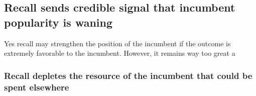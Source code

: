 \documentclass[hyphens, crop=false]{standalone}
\begin{document}
		\subsection*{Recall sends credible signal that incumbent popularity is waning}
		
		Yes recall may strengthen the position of the incumbent if the outcome is extremely
		favorable to the incumbent.
		However, it remains way too great a 
		
		
		\subsubsection*{Recall depletes the resource of the incumbent that could be spent elsewhere}
%		
%		
%		
%		
%		
%		
%		
%		
%		
		
\end{document}
